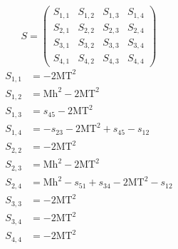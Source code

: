 \documentclass[a4paper]{article}
\begin{document}
\begin{equation}
S=\left(\begin{array}{cccc}
   S_{1,1}&
   S_{1,2}&
   S_{1,3}&
   S_{1,4}\\
   S_{2,1}&
   S_{2,2}&
   S_{2,3}&
   S_{2,4}\\
   S_{3,1}&
   S_{3,2}&
   S_{3,3}&
   S_{3,4}\\
   S_{4,1}&
   S_{4,2}&
   S_{4,3}&
   S_{4,4}\end{array}\right)
\end{equation}
\begin{subequations}
\begin{align}
   S_{1,1}&=-2\text{MT}^2\\
   S_{1,2}&=\text{Mh}^2-2\text{MT}^2\\
   S_{1,3}&=s_{45}-2\text{MT}^2\\
   S_{1,4}&=-s_{23}-2\text{MT}^2+s_{45}-s_{12}\\
   S_{2,2}&=-2\text{MT}^2\\
   S_{2,3}&=\text{Mh}^2-2\text{MT}^2\\
   S_{2,4}&=\text{Mh}^2-s_{51}+s_{34}-2\text{MT}^2-s_{12}\\
   S_{3,3}&=-2\text{MT}^2\\
   S_{3,4}&=-2\text{MT}^2\\
   S_{4,4}&=-2\text{MT}^2
\end{align}
\end{subequations}
\end{document}
